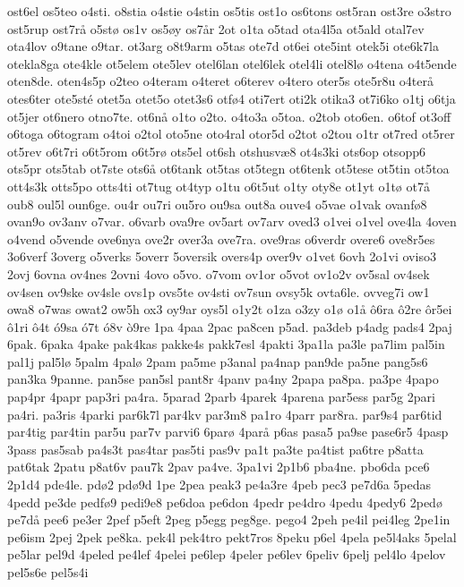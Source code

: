 ost6el
os5teo
o4sti.
o8stia
o4stie
o4stin
os5tis
ost1o
os6tons
ost5ran
ost3re
o3stro
ost5rup
ost7r^^e5
o5st^^f8
os1v
os5^^f8y
os7^^e5r
2ot
o1ta
o5tad
ota4l5a
ot5ald
otal7ev
ota4lov
o9tane
o9tar.
ot3arg
o8t9arm
o5tas
ote7d
ot6ei
ote5int
otek5i
ote6k7la
otekla8ga
ote4kle
ot5elem
ote5lev
otel6lan
otel6lek
otel4li
otel8l^^f8
o4tena
o4t5ende
oten8de.
oten4s5p
o2teo
o4teram
o4teret
o6terev
o4tero
oter5s
ote5r8u
o4ter^^e5
otes6ter
ote5st^^e9
otet5a
otet5o
otet3s6
otf^^f84
oti7ert
oti2k
otika3
ot7i6ko
o1tj
o6tja
ot5jer
ot6nero
otno7te.
ot6n^^e5
o1to
o2to.
o4to3a
o5toa.
o2tob
oto6en.
o6tof
ot3off
o6toga
o6togram
o4toi
o2tol
oto5ne
oto4ral
otor5d
o2tot
o2tou
o1tr
ot7red
ot5rer
ot5rev
o6t7ri
o6t5rom
o6t5r^^f8
ots5el
ot6sh
otshusv^^e68
ot4s3ki
ots6op
otsopp6
ots5pr
ots5tab
ot7ste
ots6^^e5
ot6tank
ot5tas
ot5tegn
ot6tenk
ot5tese
ot5tin
ot5toa
ott4s3k
otts5po
otts4ti
ot7tug
ot4typ
o1tu
o6t5ut
o1ty
oty8e
ot1yt
o1t^^f8
ot7^^e5
oub8
oul5l
oun6ge.
ou4r
ou7ri
ou5ro
ou9sa
out8a
ouve4
o5vae
o1vak
ovanf^^f88
ovan9o
ov3anv
o7var.
o6varb
ova9re
ov5art
ov7arv
oved3
o1vei
o1vel
ove4la
4oven
o4vend
o5vende
ove6nya
ove2r
over3a
ove7ra.
ove9ras
o6verdr
overe6
ove8r5es
3o6verf
3overg
o5verks
5overr
5oversik
overs4p
over9v
o1vet
6ovh
2o1vi
oviso3
2ovj
6ovna
ov4nes
2ovni
4ovo
o5vo.
o7vom
ov1or
o5vot
ov1o2v
ov5sal
ov4sek
ov4sen
ov9ske
ov4sle
ovs1p
ovs5te
ov4sti
ov7sun
ovsy5k
ovta6le.
ovveg7i
ow1
owa8
o7was
owat2
ow5h
ox3
oy9ar
oys5l
o1y2t
o1za
o3zy
o1^^f8
o1^^e5
^^f46ra
^^f42re
^^f4r5ei
^^f41ri
^^f44t
^^f39sa
^^f37t
^^f38v
^^f29re
1pa
4paa
2pac
pa8cen
p5ad.
pa3deb
p4adg
pads4
2paj
6pak.
6paka
4pake
pak4kas
pakke4s
pakk7esl
4pakti
3pa1la
pa3le
pa7lim
pal5in
pal1j
pal5l^^f8
5palm
4pal^^f8
2pam
pa5me
p3anal
pa4nap
pan9de
pa5ne
pang5s6
pan3ka
9panne.
pan5se
pan5sl
pant8r
4panv
pa4ny
2papa
pa8pa.
pa3pe
4papo
pap4pr
4papr
pap3ri
pa4ra.
5parad
2parb
4parek
4parena
par5ess
par5g
2pari
pa4ri.
pa3ris
4parki
par6k7l
par4kv
par3m8
pa1ro
4parr
par8ra.
par9s4
par6tid
par4tig
par4tin
par5u
par7v
parvi6
6par^^f8
4par^^e5
p6as
pasa5
pa9se
pase6r5
4pasp
3pass
pas5sab
pa4s3t
pas4tar
pas5ti
pas9v
pa1t
pa3te
pa4tist
pa6tre
p8atta
pat6tak
2patu
p8at6v
pau7k
2pav
pa4ve.
3pa1vi
2p1b6
pba4ne.
pbo6da
pce6
2p1d4
pde4le.
pd^^f82
pd^^f89d
1pe
2pea
peak3
pe4a3re
4peb
pec3
pe7d6a
5pedas
4pedd
pe3de
pedf^^f89
pedi9e8
pe6doa
pe6don
4pedr
pe4dro
4pedu
4pedy6
2ped^^f8
pe7d^^e5
pee6
pe3er
2pef
p5eft
2peg
p5egg
peg8ge.
pego4
2peh
pe4il
pei4leg
2pe1in
pe6ism
2pej
2pek
pe8ka.
pek4l
pek4tro
pekt7ros
8peku
p6el
4pela
pe5l4aks
5pelal
pe5lar
pel9d
4peled
pe4lef
4pelei
pe6lep
4peler
pe6lev
6peliv
6pelj
pel4lo
4pelov
pel5s6e
pel5s4i
